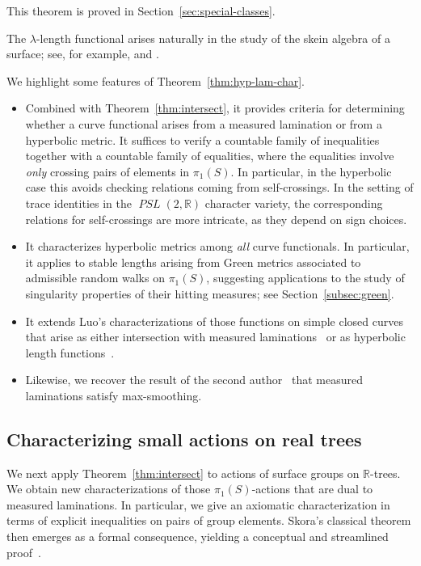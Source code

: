 \documentclass[11pt]{amsart}
\numberwithin{equation}{section}
\numberwithin{figure}{section}
\theoremstyle{definition}
\theoremstyle{plain}
\DeclareMathOperator{\PSL}{\mathit{PSL}}
\begin{document}
This theorem is proved in Section~\ref{sec:special-classes}.

The $\lambda$-length functional arises naturally in the study of the
skein algebra of a surface; see, for example,
\cite[Secs.~1--2]{Pen12:Decorated} and
\cite[Sec.~3]{Thurston14:PBI}.



We highlight some features of Theorem~\ref{thm:hyp-lam-char}.

\begin{itemize}
    \item Combined with Theorem~\ref{thm:intersect}, it provides
    criteria for determining whether a curve functional arises from a
    measured lamination or from a hyperbolic metric. It suffices to verify
    a countable family of inequalities together with a countable family of
    equalities, where the equalities involve \emph{only} crossing pairs of elements in $\pi_1(S)$. In particular, in the
    hyperbolic case this avoids checking relations coming from
    self-crossings. In the setting of trace identities in the
    $\PSL(2,\mathbb{R})$ character variety, the corresponding relations for
    self-crossings are more intricate, as they depend on sign choices.
    \item It characterizes hyperbolic metrics among \emph{all}
    curve functionals. In particular, it applies to stable lengths arising
    from Green metrics associated to admissible random walks on
    $\pi_1(S)$, suggesting applications to the study of singularity
    properties of their hitting measures; see
    Section~\ref{subsec:green}.
  \item It extends Luo’s characterizations of those
functions on simple closed curves that arise as either intersection with
measured laminations~\cite[Theorem~1.1, Theorem~1.2]{Luo98:IntersectionNumbers}
or as hyperbolic length
functions~\cite{Luo98:GeodesicLength}.
\item Likewise, we recover the result of the second
  author~\cite{Thu00:GeometricIntersection}
  that measured laminations satisfy max-smoothing.
\end{itemize}


\subsection{Characterizing small actions on real trees} 

We next apply Theorem~\ref{thm:intersect} to actions of surface groups on $\mathbb{R}$-trees. We obtain new characterizations of those $\pi_1(S)$-actions that are dual to measured laminations. In particular, we give an axiomatic characterization in terms of explicit inequalities on pairs of group elements. Skora’s classical theorem then emerges as a formal consequence, yielding a conceptual and streamlined proof~\cite{Sko90:GeometricAction}.
\end{document}
